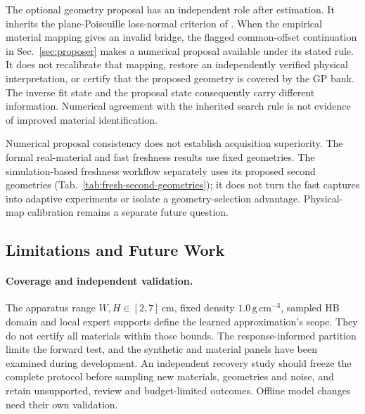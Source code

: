 The optional geometry proposal has an independent role after
estimation. It inherits the plane-Poiseuille loss-normal criterion
of \citet{hamamichi2023nonnewtonian}. When the empirical material
mapping gives an invalid bridge, the flagged common-offset
continuation in Sec.~\ref{sec:proposer} makes a numerical proposal
available under its stated rule. It does not recalibrate that mapping,
restore an independently verified physical interpretation, or certify
that the proposed geometry is covered by the GP bank. The inverse
fit state and the proposal state consequently carry different
information. Numerical agreement with the inherited search rule is
not evidence of improved material identification.

Numerical proposal consistency does not establish acquisition
superiority. The formal real-material and fast freshness results use
fixed geometries. The simulation-based freshness workflow separately
uses its proposed second geometries
(Tab.~\ref{tab:fresh-second-geometries}); it does not turn the fast
captures into adaptive experiments or isolate a geometry-selection
advantage. Physical-map calibration remains a separate future question.

\subsection{Limitations and Future Work}
\label{sec:limitations}

\paragraph{Coverage and independent validation.}
The apparatus range $W,H\in[2,7]$\,cm, fixed density
$1.0\,\mathrm{g\,cm}^{-3}$, sampled HB domain and local expert
supports define the learned approximation's scope. They do not certify
all materials within those bounds. The response-informed partition
limits the forward test, and the synthetic and material panels have
been examined during development. An independent recovery study should
freeze the complete protocol before sampling new materials, geometries
and noise, and retain unsupported, review and budget-limited outcomes.
Offline model changes need their own validation.

